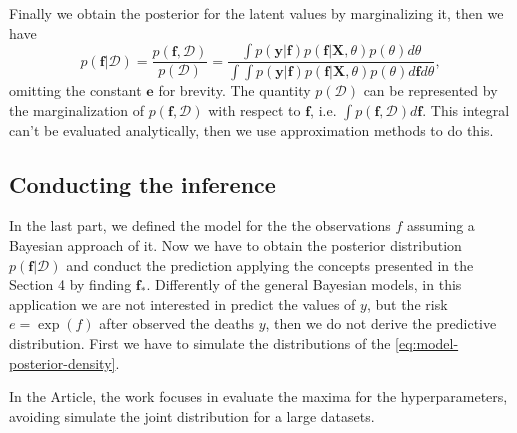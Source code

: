 %
Finally we obtain the posterior for the latent values by marginalizing it, then we have
%
\begin{equation}
    p(\mathbf{f}|\mathcal{D})=
    \frac{p(\mathbf{f},\mathcal{D})}{p(\mathcal{D})}=
    \frac{\int p(\mathbf{y}|\mathbf{f})p(\mathbf{f}|\mathbf{X},\theta)p(\theta) d\theta}{\int \int p(\mathbf{y}|\mathbf{f})p(\mathbf{f}|\mathbf{X},\theta)p(\theta) d\mathbf{f} d\theta},
 \label{eq:model-posterior-density}
\end{equation}
%
omitting the constant $\mathbf{e}$ for brevity. The quantity $p(\mathcal{D})$ can be represented by the marginalization of $p(\mathbf{f},\mathcal{D})$ with respect to $\mathbf{f}$, i.e. $\int p(\mathbf{f},\mathcal{D}) d\mathbf{f}$. This integral can't be evaluated analytically, then we use approximation methods to do this.
%

\subsection{Conducting the inference}

In the last part, we defined the model for the the observations $f$ assuming a Bayesian approach of it. Now we have to obtain the posterior distribution $p(\mathbf{f}|\mathcal{D})$ and conduct the prediction applying the concepts presented in the {\color{red} Section 4} by finding $\mathbf{f}_*$. Differently of the general Bayesian models, in this application we are not interested in predict the values of $y$, but the risk $e=\exp(f)$ after observed the deaths $y$, then we do not derive the predictive distribution.
%
First we have to simulate the distributions of the \eqref{eq:model-posterior-density}.

{\color{red}
In the Article, the work focuses in evaluate the maxima for the hyperparameters, avoiding simulate the joint distribution for a large datasets.
}

